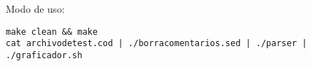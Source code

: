 Modo de uso:
\begin{verbatim}
make clean && make
cat archivodetest.cod | ./borracomentarios.sed | ./parser | ./graficador.sh 
\end{verbatim} 